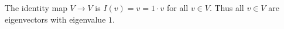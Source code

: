 The identity map $V\to V$ is $I(v)=v=1\cdot v$ for all $v\in V.$ Thus all $v\in V$ are eigenvectors with eigenvalue $1.$